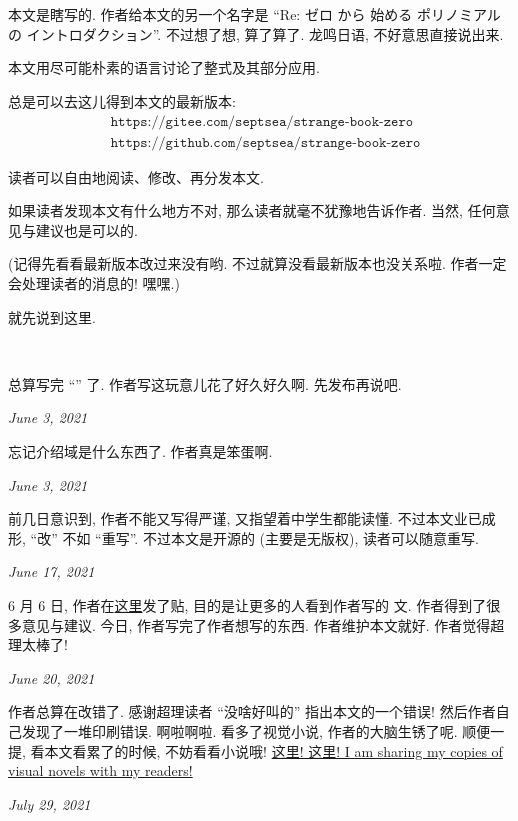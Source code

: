 \section*{\Preface}

本文是瞎写的. 作者给本文的另一个名字是 ``Re: ゼロ から 始める ポリノミアル の イントロダクション''. 不过想了想, 算了算了. 龙鸣日语, 不好意思直接说出来.

本文用尽可能朴素的语言讨论了整式及其部分应用.

总是可以去这儿得到本文的最新版本:
\begin{align*}
     & \texttt{https://gitee.com/septsea/strange-book-zero}  \\
     & \texttt{https://github.com/septsea/strange-book-zero}
\end{align*}

读者可以自由地阅读、修改、再分发本文.

如果读者发现本文有什么地方不对, 那么读者就毫不犹豫地告诉作者. 当然, 任何意见与建议也是可以的.

(记得先看看最新版本改过来没有哟. 不过就算没看最新版本也没关系啦. 作者一定会处理读者的消息的! 嘿嘿.)

就先说到这里.

~\

\providecommand{\appendDate}{}
\renewcommand{\appendDate}[1]{\par \hfill {\itshape \sffamily #1}}

\begin{remark}
    总算写完 ``\Prerequisites'' 了. 作者写这玩意儿花了好久好久啊. 先发布再说吧.
    \appendDate{June 3, 2021}
\end{remark}

\begin{remark}
    忘记介绍域是什么东西了. 作者真是笨蛋啊.
    \appendDate{June 3, 2021}
\end{remark}

\begin{remark}
    前几日意识到, 作者不能又写得严谨, 又指望着中学生都能读懂. 不过本文业已成形, ``改'' 不如 ``重写''. 不过本文是开源的 (主要是无版权), 读者可以随意重写.
    \appendDate{June 17, 2021}
\end{remark}

\begin{remark}
    6 月 6 日, 作者在\hyperref{https://chaoli.club/index.php/6396}{}{}{这里}发了贴, 目的是让更多的人看到作者写的  文. 作者得到了很多意见与建议. 今日, 作者写完了作者想写的东西. 作者维护本文就好. 作者觉得超理太棒了!
    \appendDate{June 20, 2021}
\end{remark}

\begin{remark}
    作者总算在改错了. 感谢超理读者 ``没啥好叫的'' 指出本文的一个错误! 然后作者自己发现了一堆印刷错误. 啊啦啊啦. 看多了视觉小说, 作者的大脑生锈了呢. 顺便一提, 看本文看累了的时候, 不妨看看小说哦! \hyperref{https://gitee.com/septsea/ss}{}{}{这里! 这里! I am sharing my copies of visual novels with my readers!}
    \appendDate{July 29, 2021}
\end{remark}
